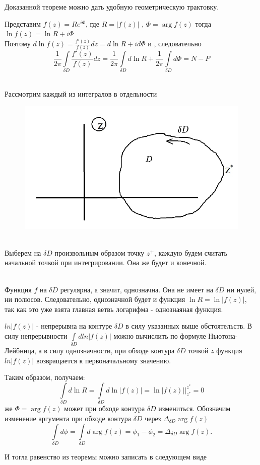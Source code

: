 \documentclass[a4paper, 12pt]{report}
\begin{document}
\par\bigskip Доказанной теореме можно дать удобную геометрическую трактовку.
\par Представим \( f(z) = R e^{i\Phi}\), где \(R=|f(z)|\) , \(\Phi = \arg f(z)\) тогда  \(\ln f(z) = \ln R + i\Phi\)  
\\Поэтому \( d\ln f(z) = \frac{f'(z)}{f(z)} dz = d\ln R + id\Phi \) и , следовательно
$$ \frac{1}{2\pi} \int\limits_{\delta D}  \frac{f'(z)}{f(z)} dz = \frac{1}{2\pi} \int\limits_{\delta D} d\ln R + \frac{1}{2\pi} \int\limits_{\delta D}  d\Phi = N-P$$
\par\bigskip
\\Рассмотрим каждый из интегралов в отдельности 
\begin{figure} 
    \vspace{-1ex}
    \includegraphics[width=6 cm]{argument/1.jpg}
\end{figure}
\\Выберем на  \(\delta D\) произвольным образом точку \(z^+\), каждую будем считать начальной точкой при интегрировании. Она же будет и конечной.

\\Функция \(f\) на  \(\delta D\) регулярна, а значит, однозначна. Она не имеет на  \(\delta D\) ни нулей, ни полюсов. Следовательно, однозначной будет и функция \(\ln R = \ln |f(z)|\), так как это уже взята главная ветвь логарифма - однознаяная функция.\par\bigskip \(ln|f(z)|\) - непрерывна на контуре  \(\delta D\) в силу указанных выше обстоятельств. В силу непрерывности \(\int\limits_{\delta D} dln|f(z)|\) можно вычислить по формуле Ньютона-Лейбница, а в силу однозначности, при обходе контура \(\delta D\) точкой \(z\) функция \(ln|f(z)|\) возвращается к первоначальному значению.\par Таким образом, получаем: 
$$\int\limits_{\delta D} d\ln R = \int\limits_{\delta D}  d\ln|f(z)| = \ln|f(z)|\bigg|_{z^*}^{z^*}=0 $$
 же  \(\Phi = \arg f(z)\)  может при обходе контура \(\delta D\) измениться. Обозначим изменение аргумента при обходе контура \(\delta D\) через 
\( \Delta_{\delta D} \arg f(z) \)   
 $$\int\limits_{\delta D} d\phi = \int\limits_{\delta D} d \arg f(z) = \phi _1 - \phi_2 = \Delta_{\delta D} \arg f(z).$$
\par И тогла равенство из теоремы можно записать в следующем виде 
\begin{center}
\end{center}
 
\end{document}
